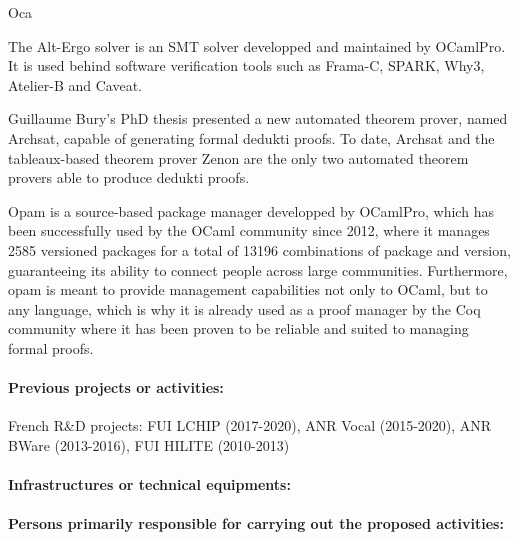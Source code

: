 \begin{sitedescription}{Oca}
\begin{compactitem}
\item The Alt-Ergo solver\cite{ae2.2} is an SMT solver developped and maintained by OCamlPro.
  It is used behind software verification tools such as Frama-C, SPARK, Why3,
  Atelier-B and Caveat.
\item Guillaume Bury's PhD thesis\cite{BURY19} presented a new automated theorem
  prover, named Archsat, capable of generating formal dedukti proofs. To date,
  Archsat and the tableaux-based theorem prover Zenon are the only two automated
  theorem provers able to produce dedukti proofs.
\item Opam\cite{OPAM} is a source-based package manager developped by OCamlPro,
  which has been successfully used by the OCaml community since 2012, where
  it manages 2585 versioned packages for a total of 13196 combinations of package
  and version, guaranteeing its ability to connect people across large communities.
  Furthermore, opam is meant to provide management capabilities not only to
  OCaml, but to any language, which is why it is already used as a proof manager
  by the Coq community where it has been proven to be reliable and suited to
  managing formal proofs.
\end{compactitem}

\paragraph{Previous projects or activities:}


\begin{compactitem}
\item French R\&D projects: FUI LCHIP (2017-2020), ANR Vocal (2015-2020), ANR BWare (2013-2016), FUI HILITE (2010-2013)
\end{compactitem}

\paragraph{Infrastructures or technical equipments:}


\paragraph{Persons primarily responsible for carrying out the proposed activities:}


\end{sitedescription}
